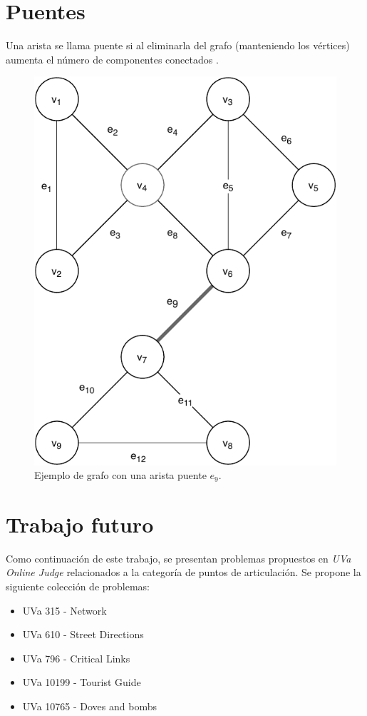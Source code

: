 \section{Puentes}\label{bridges}
Una arista se llama puente si al eliminarla del grafo (manteniendo los vértices) aumenta el número de componentes conectados \cite{Jaimini2017}.

\begin{figure}[H]
	\centering
	\includegraphics[width=0.4\linewidth]{document/ArticulationPoints/images/example-of-bridge}
	\caption{Ejemplo de grafo con una arista puente \( e_9 \).}
	\label{fig:example-of-bridge}
\end{figure}

\section{Trabajo futuro}\label{futurework}
Como continuación de este trabajo, se presentan problemas propuestos en \textit{UVa Online Judge} relacionados a la categoría de puntos de articulación. Se propone la siguiente colección de problemas:
\begin{itemize}
	\item UVa 315 - Network
	\item UVa 610 - Street Directions
	\item UVa 796 - Critical Links
	\item UVa 10199 - Tourist Guide
	\item UVa 10765 - Doves and bombs
\end{itemize}